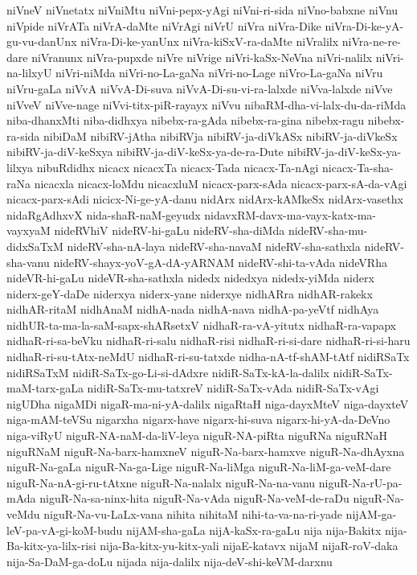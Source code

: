 {niVneV
niVnetatx
niVniMtu
niVni-pepx-yAgi
niVni-ri-sida
niVno-babxne
niVnu
niVpide
niVrATa
niVrA-daMte
niVrAgi
niVrU
niVra
niVra-Dike
niVra-Di-ke-yA-gu-vu-danUnx
niVra-Di-ke-yanUnx
niVra-kiSxV-ra-daMte
niVralilx
niVra-ne-re-dare
niVranunx
niVra-pupxde
niVre
niVrige
niVri-kaSx-NeVna
niVri-nalilx
niVri-na-lilxyU
niVri-niMda
niVri-no-La-gaNa
niVri-no-Lage
niVro-La-gaNa
niVru
niVru-gaLa
niVvA
niVvA-Di-suva
niVvA-Di-su-vi-ra-lalxde
niVva-lalxde
niVve
niVveV
niVve-nage
niVvi-titx-piR-rayayx
niVvu
nibaRM-dha-vi-lalx-du-da-riMda
niba-dhanxMti
niba-didhxya
nibebx-ra-gAda
nibebx-ra-gina
nibebx-ragu
nibebx-ra-sida
nibiDaM
nibiRV-jAtha
nibiRVja
nibiRV-ja-diVkASx
nibiRV-ja-diVkeSx
nibiRV-ja-diV-keSxya
nibiRV-ja-diV-keSx-ya-de-ra-Dute
nibiRV-ja-diV-keSx-ya-lilxya
nibuRdidhx
nicacx
nicacxTa
nicacx-Tada
nicacx-Ta-nAgi
nicacx-Ta-sha-raNa
nicacxla
nicacx-loMdu
nicacxluM
nicacx-parx-sAda
nicacx-parx-sA-da-vAgi
nicacx-parx-sAdi
nicicx-Ni-ge-yA-danu
nidArx
nidArx-kAMkeSx
nidArx-vasethx
nidaRgAdhxvX
nida-shaR-naM-geyudx
nidavxRM-davx-ma-vayx-katx-ma-vayxyaM
nideRVhiV
nideRV-hi-gaLu
nideRV-sha-diMda
nideRV-sha-mu-didxSaTxM
nideRV-sha-nA-laya
nideRV-sha-navaM
nideRV-sha-sathxla
nideRV-sha-vanu
nideRV-shayx-yoV-gA-dA-yARNAM
nideRV-shi-ta-vAda
nideVRha
nideVR-hi-gaLu
nideVR-sha-sathxla
nidedx
nidedxya
nidedx-yiMda
niderx
niderx-geY-daDe
niderxya
niderx-yane
niderxye
nidhARra
nidhAR-rakekx
nidhAR-ritaM
nidhAnaM
nidhA-nada
nidhA-nava
nidhA-pa-yeVtf
nidhAya
nidhUR-ta-ma-la-saM-sapx-shARsetxV
nidhaR-ra-vA-yitutx
nidhaR-ra-vapapx
nidhaR-ri-sa-beVku
nidhaR-ri-salu
nidhaR-risi
nidhaR-ri-si-dare
nidhaR-ri-si-haru
nidhaR-ri-su-tAtx-neMdU
nidhaR-ri-su-tatxde
nidha-nA-tf-shAM-tAtf
nidiRSaTx
nidiRSaTxM
nidiR-SaTx-go-Li-si-dAdxre
nidiR-SaTx-kA-la-dalilx
nidiR-SaTx-maM-tarx-gaLa
nidiR-SaTx-mu-tatxreV
nidiR-SaTx-vAda
nidiR-SaTx-vAgi
nigUDha
nigaMDi
nigaR-ma-ni-yA-dalilx
nigaRtaH
niga-dayxMteV
niga-dayxteV
niga-mAM-teVSu
nigarxha
nigarx-have
nigarx-hi-suva
nigarx-hi-yA-da-DeVno
niga-viRyU
niguR-NA-naM-da-liV-leya
niguR-NA-piRta
niguRNa
niguRNaH
niguRNaM
niguR-Na-barx-hamxneV
niguR-Na-barx-hamxve
niguR-Na-dhAyxna
niguR-Na-gaLa
niguR-Na-ga-Lige
niguR-Na-liMga
niguR-Na-liM-ga-veM-dare
niguR-Na-nA-gi-ru-tAtxne
niguR-Na-nalalx
niguR-Na-na-vanu
niguR-Na-rU-pa-mAda
niguR-Na-sa-ninx-hita
niguR-Na-vAda
niguR-Na-veM-de-raDu
niguR-Na-veMdu
niguR-Na-vu-LaLx-vana
nihita
nihitaM
nihi-ta-va-na-ri-yade
nijAM-ga-leV-pa-vA-gi-koM-budu
nijAM-sha-gaLa
nijA-kaSx-ra-gaLu
nija
nija-Bakitx
nija-Ba-kitx-ya-lilx-risi
nija-Ba-kitx-yu-kitx-yali
nijaE-katavx
nijaM
nijaR-roV-daka
nija-Sa-DaM-ga-doLu
nijada
nija-dalilx
nija-deV-shi-keVM-darxnu
}
